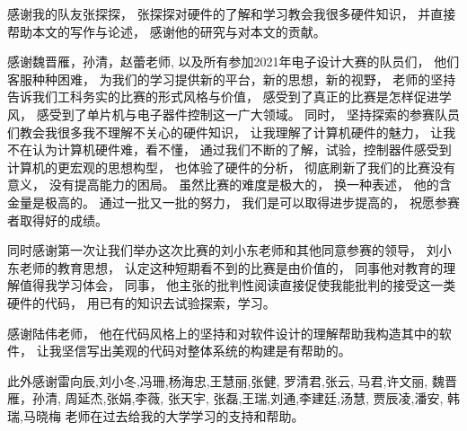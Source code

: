 \documentclass[../main.tex]{subfiles}
\begin{document}

感谢我的队友张探探，
张探探对硬件的了解和学习教会我很多硬件知识，
并直接帮助本文的写作与论述，
感谢他的研究与对本文的贡献。

感谢魏晋雁，孙清，赵蕾老师,
以及所有参加2021年电子设计大赛的队员们，
他们客服种种困难，
为我们的学习提供新的平台，新的思想，新的视野，
老师的坚持告诉我们工科务实的比赛的形式风格与价值，
感受到了真正的比赛是怎样促进学风，
感受到了单片机与电子器件控制这一广大领域。
同时，
坚持探索的参赛队员们教会我很多我不理解不关心的硬件知识，
让我理解了计算机硬件的魅力，
让我不在认为计算机硬件难，看不懂，
通过我们不断的了解，试验，控制器件感受到计算机的更宏观的思想构型，
也体验了硬件的分析，
彻底刷新了我们的比赛没有意义，
没有提高能力的困局。
虽然比赛的难度是极大的，
换一种表述，
他的含金量是极高的。
通过一批又一批的努力，
我们是可以取得进步提高的，
祝愿参赛者取得好的成绩。

同时感谢第一次让我们举办这次比赛的刘小东老师和其他同意参赛的领导，
刘小东老师的教育思想，
认定这种短期看不到的比赛是由价值的，
同事他对教育的理解值得我学习体会，
同事，
他主张的批判性阅读直接促使我能批判的接受这一类硬件的代码，
用已有的知识去试验探索，学习。

感谢陆伟老师，
他在代码风格上的坚持和对软件设计的理解帮助我构造其中的软件，
让我坚信写出美观的代码对整体系统的构建是有帮助的。

此外感谢雷向辰,刘小冬,冯珊,杨海忠,王慧丽,张健,
罗清君,张云,
马君,许文丽,
魏晋雁，孙清,
周延杰,张娟,李薇,
张天宇, 张磊,王瑞,刘通,李建廷,汤慧,
贾辰凌,潘安,
韩瑞,马晓梅%
老师在过去给我的大学学习的支持和帮助。
\end{document}
